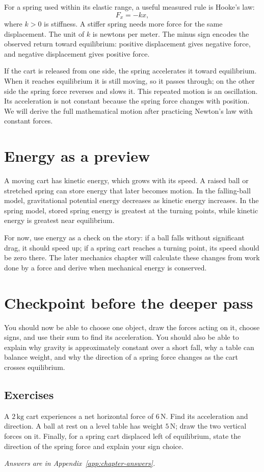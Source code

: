 \documentclass[11pt,oneside]{book}
\theoremstyle{reviewstyle}
\newcommand{\learningcheck}[1]{\subsection*{Exercises}\noindent #1\par\smallskip\noindent\emph{Answers are in Appendix~\ref{app:chapter-answers}.}}
\begin{document}
For a spring used within its elastic range, a useful measured rule is Hooke's law:
\begin{equation}
F_x=-kx,
\end{equation}
where $k>0$ is stiffness. A stiffer spring needs more force for the same displacement. The unit of $k$ is newtons per meter. The minus sign encodes the observed return toward equilibrium: positive displacement gives negative force, and negative displacement gives positive force.

If the cart is released from one side, the spring accelerates it toward equilibrium. When it reaches equilibrium it is still moving, so it passes through; on the other side the spring force reverses and slows it. This repeated motion is an oscillation. Its acceleration is not constant because the spring force changes with position. We will derive the full mathematical motion after practicing Newton's law with constant forces.

\section{Energy as a preview}
A moving cart has kinetic energy, which grows with its speed. A raised ball or stretched spring can store energy that later becomes motion. In the falling-ball model, gravitational potential energy decreases as kinetic energy increases. In the spring model, stored spring energy is greatest at the turning points, while kinetic energy is greatest near equilibrium.

For now, use energy as a check on the story: if a ball falls without significant drag, it should speed up; if a spring cart reaches a turning point, its speed should be zero there. The later mechanics chapter will calculate these changes from work done by a force and derive when mechanical energy is conserved.

\section{Checkpoint before the deeper pass}
You should now be able to choose one object, draw the forces acting on it, choose signs, and use their sum to find its acceleration. You should also be able to explain why gravity is approximately constant over a short fall, why a table can balance weight, and why the direction of a spring force changes as the cart crosses equilibrium.

\learningcheck{A $2\,\mathrm{kg}$ cart experiences a net horizontal force of $6\,\mathrm N$. Find its acceleration and direction. A ball at rest on a level table has weight $5\,\mathrm N$; draw the two vertical forces on it. Finally, for a spring cart displaced left of equilibrium, state the direction of the spring force and explain your sign choice.}
\end{document}
